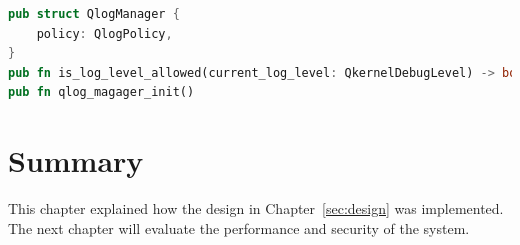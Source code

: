 \begin{lstlisting}[language=rust, caption= API of Qlog manager, label={lst:Qlog}]
pub struct QlogManager {
    policy: QlogPolicy,
}
pub fn is_log_level_allowed(current_log_level: QkernelDebugLevel) -> bool
pub fn qlog_magager_init()   
\end{lstlisting}


\section{Summary}
This chapter explained how the design in Chapter~\ref{sec:design} was implemented. The next chapter will evaluate the performance and security of the system.


\cleardoublepage




